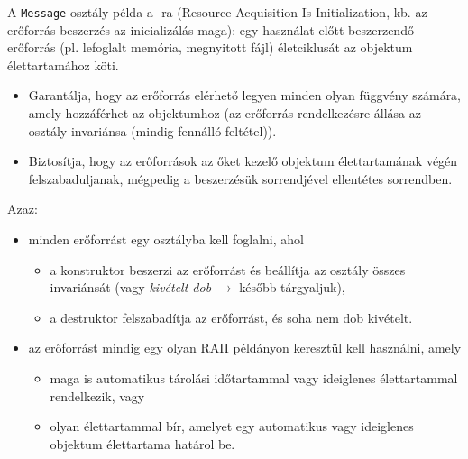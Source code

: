 \documentclass[usenames,dvipsnames,aspectratio=169]{beamer}
\begin{document}
\begin{frame}
    \footnotesize
    A \texttt{Message} osztály példa a -ra (Resource Acquisition Is Initialization, kb. az erőforrás-beszerzés az inicializálás maga): egy használat előtt beszerzendő erőforrás (pl. lefoglalt memória, megnyitott fájl) életciklusát az objektum élettartamához köti.

    \begin{itemize}
        \item Garantálja, hogy az erőforrás elérhető legyen minden olyan függvény számára, amely hozzáférhet az objektumhoz (az erőforrás rendelkezésre állása az osztály invariánsa (mindig fennálló feltétel)).
        \item Biztosítja, hogy az erőforrások az őket kezelő objektum élettartamának végén felszabaduljanak, mégpedig a beszerzésük sorrendjével ellentétes sorrendben.
    \end{itemize}

    Azaz:
    \begin{itemize}
        \item minden erőforrást egy osztályba kell foglalni, ahol
        \begin{itemize}
            \item a konstruktor beszerzi az erőforrást és beállítja az osztály összes invariánsát (vagy \emph{kivételt dob} $\to$ később tárgyaljuk),
            \item a destruktor felszabadítja az erőforrást, és soha nem dob kivételt.
        \end{itemize}
        \item az erőforrást mindig egy olyan RAII példányon keresztül kell használni, amely
        \begin{itemize}
            \item maga is automatikus tárolási időtartammal vagy ideiglenes élettartammal rendelkezik, vagy
            \item olyan élettartammal bír, amelyet egy automatikus vagy ideiglenes objektum élettartama határol be.
        \end{itemize}
    \end{itemize}
\end{frame}
\end{document}
